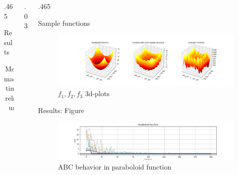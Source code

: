 \documentclass[final,hyperref]{beamer}
\begin{document}
\begin{frame}[t]
\begin{columns}[t]
\begin{column}{.465\textwidth}
\begin{block}{Results}
\begin{table}
\begin{tabular}{r|c c c c}
		\end{tabular}

		\caption{Median machine time in relative units}
	\end{table}
 

\end{block}



\end{column} %

\begin{column}{.03\textwidth}\end{column} %
 
\begin{column}{.465\textwidth} %



\begin{block}{Sample functions}
	
\begin{figure}[H]
	\includegraphics[width=1.0\linewidth]{samples.png}
	\caption{$f_1, f_2, f_3$ 3d-plots}
\end{figure}

\end{block}



\begin{block}{Results: Figure}

\begin{figure}[H]
	\includegraphics[width=0.9\linewidth]{paraboloid_tr.png}
	\caption{ABC behavior in paraboloid function}
\end{figure}


\end{block}
\end{column}
\end{columns}
\end{frame}
\end{document}

